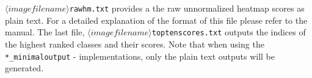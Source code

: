 \documentclass[a4wide]{article}
\begin{document}
\begin{itemize}
\begin{itemize}
\texttt{$\langle imagefilename\rangle$\textunderscore rawhm.txt} provides a the raw unnormalized heatmap scores as plain text. For a detailed explanation of the format of this file please refer to the manual. The last file, \texttt{$\langle imagefilename\rangle$\textunderscore toptenscores.txt} outputs the indices of the highest ranked classes and their scores.
Note that when using the \texttt{*\_minimaloutput} - implementations, only the plain text outputs will be generated.
			\end{itemize}
\end{itemize}
\end{document}

